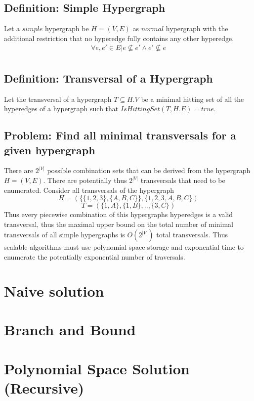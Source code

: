 \documentclass[10pt]{article}
\begin{document}
\subsection{Definition: Simple Hypergraph}
Let a $simple$ hypergraph be $H=(V,E)$ as $normal$ hypergraph with the additional restriction that no hyperedge fully contains any other hyperedge. \begin{equation*}
	\begin{matrix}
	\forall e , e' \in E \vert e \not \subseteq e' \wedge e' \not \subseteq e\\
	\end{matrix}
\end{equation*}

\subsection{Definition: Transversal of a Hypergraph}
Let the transversal of a hypergraph $T \subseteq H.V$ be a minimal hitting set of all the hyperedges of a hypergraph such that $IsHittingSet(T,H.E) = true$. 


\subsection{Problem: Find all minimal transversals for a given hypergraph}
There are $2^{|V|}$ possible combination sets that can be derived from the hypergraph $H=(V,E)$. There are potentially thus $2^{|V|}$ transversals that need to be enumerated. Consider all transversals of the hypergraph \\ $$H=(\{\{1,2,3\},\{A,B,C\}\},\{1,2,3,A,B,C\})$$ $$T=(\{1,A\},\{1,B\},..,\{3,C\})$$  Thus every piecewise combination of this hypergraphs hyperedges is a valid transversal, thus the maximal upper bound on the total number of minimal transversals of all simple hypergraphs is  $O(2^{|V|})$ total transversals. Thus scalable algorithms must use polynomial space storage and exponential time to enumerate the potentially exponential number of traversals.

\section{Naive solution} 

\section{Branch and Bound}

\section{Polynomial Space Solution (Recursive)}
\end{document}
